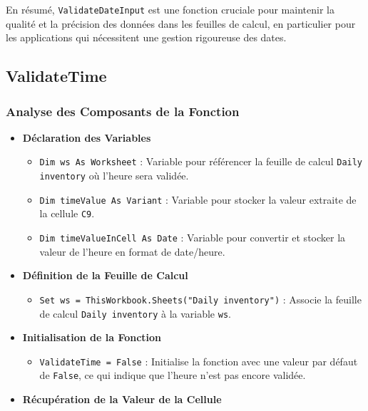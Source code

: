 \documentclass[a4paper, oneside, 12pt, final]{extreport}
\begin{document}
En résumé, \texttt{ValidateDateInput} est une fonction cruciale pour maintenir la qualité et la précision des données dans les feuilles de calcul, en particulier pour les applications qui nécessitent une gestion rigoureuse des dates.

\subsection{ValidateTime}



\subsubsection{Analyse des Composants de la Fonction}
\begin{itemize}

\item\textbf{Déclaration des Variables}

\begin{itemize}
    \item \texttt{Dim ws As Worksheet} : Variable pour référencer la feuille de calcul \texttt{Daily inventory} où l'heure sera validée.
    \item \texttt{Dim timeValue As Variant} : Variable pour stocker la valeur extraite de la cellule \texttt{C9}.
    \item \texttt{Dim timeValueInCell As Date} : Variable pour convertir et stocker la valeur de l'heure en format de date/heure.
\end{itemize}

\item\textbf{Définition de la Feuille de Calcul}

\begin{itemize}
    \item \texttt{Set ws = ThisWorkbook.Sheets("Daily inventory")} : Associe la feuille de calcul \texttt{Daily inventory} à la variable \texttt{ws}.
\end{itemize}

\item\textbf{Initialisation de la Fonction}

\begin{itemize}
    \item \texttt{ValidateTime = False} : Initialise la fonction avec une valeur par défaut de \texttt{False}, ce qui indique que l'heure n'est pas encore validée.
\end{itemize}

\item\textbf{Récupération de la Valeur de la Cellule}


\end{itemize}
\end{document}
